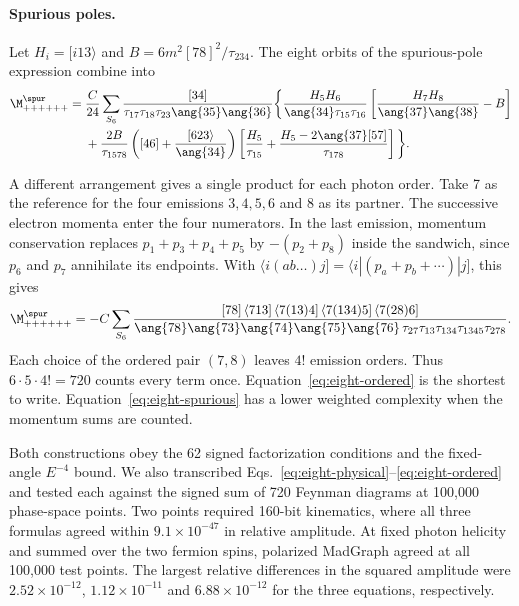 \paragraph{Spurious poles.}
Let $H_i=[i13\rangle$ and $B=6m^2[78]^2/\tau_{234}$.
The eight orbits of the spurious-pole expression combine into
\begin{equation}\label{eq:eight-spurious}
\begin{aligned}
 \M_{++++++}^{\spur}={}&\frac{C}{24}\sum_{S_6}
 \frac{[34]}{\tau_{17}\tau_{18}\tau_{23}\ang{35}\ang{36}}
 \bigg\{\frac{H_5H_6}{\ang{34}\tau_{15}\tau_{16}}
 \left[\frac{H_7 H_8}{\ang{37}\ang{38}}-B\right]\\
 &+\frac{2B}{\tau_{1578}}\left([46]+\frac{[623\rangle}{\ang{34}}\right)
 \left[\frac{H_5}{\tau_{15}}+
       \frac{H_5-2\ang{37}[57]}{\tau_{178}}\right]\bigg\}.
\end{aligned}
\end{equation}

A different arrangement gives a single product for each photon order.
Take 7 as the reference for the four emissions $3,4,5,6$ and 8 as
its partner. The successive electron momenta enter the four numerators.
In the last emission, momentum conservation replaces
$p_1+p_3+p_4+p_5$ by $-(p_2+p_8)$ inside the sandwich, since $p_6$
and $p_7$ annihilate its endpoints. With
$\langle i(ab\ldots)j]=\langle i|(p_a+p_b+\cdots)|j]$, this gives
\begin{equation}\label{eq:eight-ordered}
 \M_{++++++}^{\spur}=-C\sum_{S_6}
 \frac{[78]\,\langle713]\,\langle7(13)4]\,
        \langle7(134)5]\,\langle7(28)6]}
 {\ang{78}\ang{73}\ang{74}\ang{75}\ang{76}\,
  \tau_{27}\tau_{13}\tau_{134}\tau_{1345}\tau_{278}} .
\end{equation}
Each choice of the ordered pair $(7,8)$ leaves $4!$ emission orders.
Thus $6\cdot5\cdot4!=720$ counts every term once. Equation~\eqref{eq:eight-ordered}
is the shortest to write. Equation~\eqref{eq:eight-spurious} has a lower
weighted complexity when the momentum sums are counted.

Both constructions obey the 62 signed factorization conditions and the
fixed-angle $E^{-4}$ bound. We also transcribed
Eqs.~\eqref{eq:eight-physical}--\eqref{eq:eight-ordered} and tested each
against the signed sum of 720 Feynman diagrams at 100,000 phase-space
points. Two points required 160-bit kinematics, where all three formulas
agreed within $9.1\times10^{-47}$ in relative amplitude. At fixed photon
helicity and summed over the two fermion spins, polarized MadGraph agreed
at all 100,000 test points. The largest relative differences in the squared
amplitude were $2.52\times10^{-12}$, $1.12\times10^{-11}$ and
$6.88\times10^{-12}$ for the three equations, respectively.
